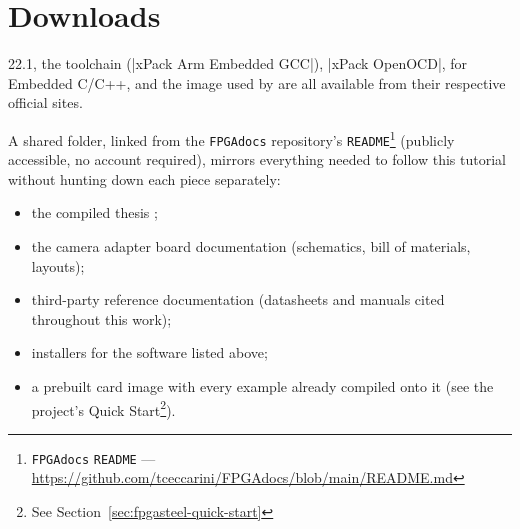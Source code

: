 \chapter{Downloads}
\label{chap:fpgasteel-downloads}

 22.1, the  toolchain (|xPack Arm Embedded GCC|), |xPack OpenOCD|,   for Embedded C/C++, and the  image used by  are all available from their respective official sites.

A shared folder, linked from the \texttt{FPGAdocs} repository's \texttt{README}\footnote{\texttt{FPGAdocs} \texttt{README} --- \url{https://github.com/tceccarini/FPGAdocs/blob/main/README.md}} (publicly accessible, no account required), mirrors everything needed to follow this tutorial without hunting down each piece separately:

\begin{itemize}
    \item the compiled thesis ;
    \item the camera adapter board documentation (schematics, bill of materials,  layouts);
    \item third-party reference documentation (datasheets and manuals cited throughout this work);
    \item installers for the software listed above;
    \item a prebuilt  card image with every  example already compiled onto it (see the project's Quick Start\footnote{See Section~\ref{sec:fpgasteel-quick-start}}).
\end{itemize}
